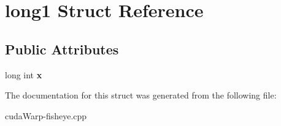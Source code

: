 \hypertarget{structlong1}{}\section{long1 Struct Reference}
\label{structlong1}
\subsection*{Public Attributes}
\begin{DoxyCompactItemize}
\item 
long int {\bfseries x}\hypertarget{structlong1_a215531823314b384d19298e8f01122a2}{}\label{structlong1_a215531823314b384d19298e8f01122a2}

\end{DoxyCompactItemize}


The documentation for this struct was generated from the following file\+:\begin{DoxyCompactItemize}
\item 
cuda\+Warp-\/fisheye.\+cpp\end{DoxyCompactItemize}
